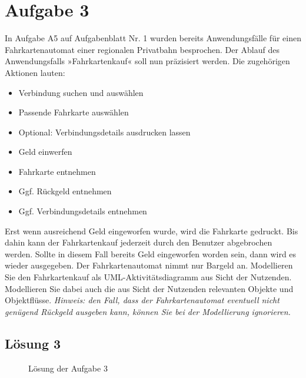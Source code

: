 \documentclass[main.tex]{subfiles}
\begin{document}
\section{Aufgabe 3}
In Aufgabe A5 auf Aufgabenblatt Nr. 1 wurden bereits Anwendungsfälle für einen Fahrkartenautomat einer regionalen Privatbahn besprochen. Der Ablauf des Anwendungsfalls »Fahrkartenkauf« soll nun präzisiert werden. Die zugehörigen Aktionen lauten:

\begin{itemize}
\item Verbindung suchen und auswählen
\item Passende Fahrkarte auswählen
\item Optional: Verbindungsdetails ausdrucken lassen
\item Geld einwerfen
\item Fahrkarte entnehmen
\item Ggf. Rückgeld entnehmen
\item Ggf. Verbindungsdetails entnehmen
\end{itemize}

Erst wenn ausreichend Geld eingeworfen wurde, wird die Fahrkarte gedruckt. Bis dahin kann der Fahrkartenkauf jederzeit durch den Benutzer abgebrochen werden. Sollte in diesem Fall bereits Geld eingeworfen worden sein, dann wird es wieder ausgegeben. Der Fahrkartenautomat nimmt nur Bargeld an.
Modellieren Sie den Fahrkartenkauf als UML-Aktivitätsdiagramm aus Sicht der Nutzenden. Modellieren Sie dabei auch die aus Sicht der Nutzenden relevanten Objekte und Objektflüsse.
\textit{Hinweis: den Fall, dass der Fahrkartenautomat eventuell nicht genügend Rückgeld ausgeben kann, können Sie bei der Modellierung ignorieren.}

\pagebreak
\subsection{Lösung 3}
\begin{figure}[h]
    \caption{Lösung der Aufgabe 3}
    \label{fig:lgs3}
\end{figure}
\end{document}
